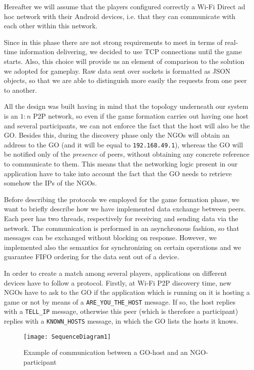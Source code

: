 Hereafter we will assume that the players configured correctly a Wi-Fi Direct
ad hoc network with their Android devices, i.e. that they can communicate with
each other within this network.

Since in this phase there are not strong requirements to meet in terms of
real-time information delivering, we decided to use TCP connections until the
game starts. Also, this choice will provide us an element of comparison to the
solution we adopted for gameplay.
Raw data sent over sockets is formatted as JSON objects, so that we are able to
distinguish more easily the requests from one peer to another.

All the design was built having in mind that the topology underneath our system
is an $1:n$ P2P network, so even if the game formation carries out having one
host and several participants, we can not enforce the fact that the host will
also be the GO. Besides this, during the discovery phase only the NGOs will
obtain an address to the GO (and it will be equal to \texttt{192.168.49.1}),
whereas the GO will be notified only of the \textit{presence} of peers, without
obtaining any concrete reference to communicate to them. This means that the
networking logic present in our application have to take into account the fact
that the GO needs to retrieve somehow the IPs of the NGOs.

Before describing the protocols we employed for the game formation phase, we
want to briefly describe how we have implemented data exchange between peers.
Each peer has two threads, respectively for receiving and sending data via the
network. The communication is performed in an asynchronous fashion, so that
messages can be exchanged without blocking on response. However, we implemented
also the semantics for synchronizing on certain operations and we guarantee FIFO
ordering for the data sent out of a device.

In order to create a match among several players, applications on different
devices have to follow a protocol. Firstly, at Wi-Fi P2P discovery time, new
NGOs have to ask to the GO if the application which is running on it is hosting
a game or not by means of a \texttt{ARE\_YOU\_THE\_HOST} message. If so, the
host replies with a \texttt{TELL\_IP} message, otherwise this peer (which is
therefore a participant) replies with a \texttt{KNOWN\_HOSTS} message, in which
the GO lists the hosts it knows.

\begin{figure}[h]
    \centering
    \texttt{[image: SequenceDiagram1]}
    \caption{Example of communication between a GO-host and an NGO-participant}
    \label{fig:seqDiagram1}
\end{figure}

